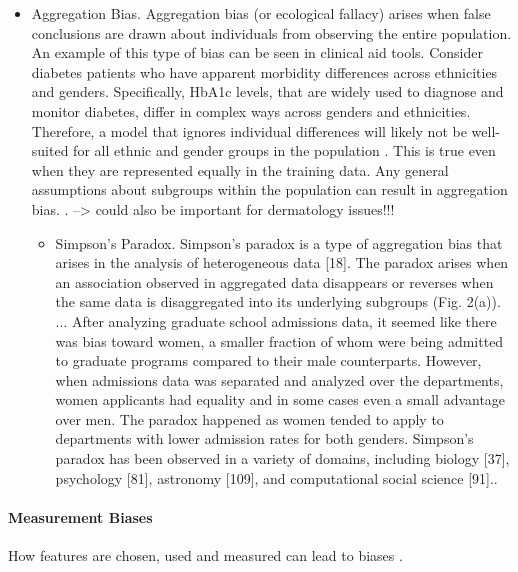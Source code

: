 \documentclass[12pt, a4paper, oneside]{book}   	%
\newif\ifrawcitationactive
\newcommand{\rawcitationend}{\color{black}\rawcitationactivefalse}
\newcommand{\rawcitationusedend}{%
	\ifrawcitationactive
	\color{purple}  %
	\else
	\color{black}  %
	\fi
}
\begin{document}
\begin{itemize}
					\item Aggregation Bias. Aggregation bias (or ecological fallacy) arises when false conclusions are drawn about individuals from observing the entire population. An example of this type of bias can be seen in clinical aid tools. Consider diabetes patients who have apparent morbidity differences across ethnicities and genders. Specifically, HbA1c levels, that are widely used to diagnose and monitor diabetes, differ in complex ways across genders and ethnicities. Therefore, a model that ignores individual differences will likely not be well-suited for all ethnic and gender groups in the population \autocite{M144_Suresh_2021}. This is true even when they are represented equally in the training data. Any general assumptions about subgroups within the population can result in aggregation bias. \autocite{Mehrabi_2021}. --> could also be important for dermatology issues!!!
					\begin{itemize}
						\item Simpson’s Paradox. Simpson’s paradox is a type of aggregation bias that arises in the analysis of heterogeneous data [18]. The paradox arises when an association observed in aggregated data disappears or reverses when the same data is disaggregated into its underlying subgroups (Fig. 2(a)). ... After analyzing graduate school admissions data, it seemed like there was bias toward women, a smaller fraction of whom were being admitted to graduate programs compared to their male counterparts. However, when admissions data was separated and analyzed over the departments, women applicants had equality and in some cases even a small advantage over men. The paradox happened as women tended to apply to departments with lower admission rates for both genders. Simpson’s paradox has been observed in a variety of domains, including biology [37], psychology [81], astronomy [109], and computational social science [91].\autocite{Mehrabi_2021}.
					\end{itemize}
				\end{itemize}
				\rawcitationusedend
				\rawcitationend
			
			\paragraph{Measurement Biases}
			How features are chosen, used and measured can lead to biases \autocites{Mehrabi_2021}{M144_Suresh_2021}.
			
\end{document}
